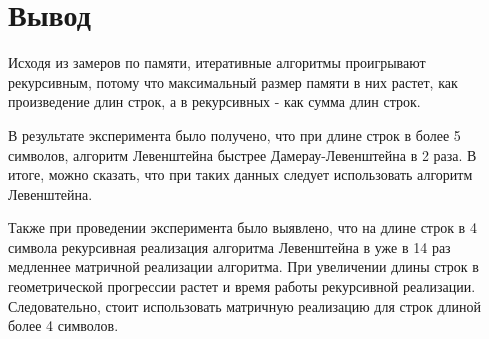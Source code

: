 \section{Вывод}

Исходя из замеров по памяти, итеративные алгоритмы проигрывают рекурсивным, потому что максимальный размер памяти в них растет, как произведение длин строк, а в рекурсивных - как сумма длин строк.

В результате эксперимента было получено, что при длине строк в более 5 символов, алгоритм Левенштейна быстрее Дамерау-Левенштейна в 2 раза. В итоге, можно сказать, что при таких данных следует использовать алгоритм Левенштейна.

Также при проведении эксперимента было выявлено, что на длине строк в 4 символа рекурсивная реализация алгоритма Левенштейна в уже в 14 раз медленнее матричной реализации алгоритма. При увеличении длины строк в геометрической прогрессии растет и время работы рекурсивной реализации. Следовательно, стоит использовать матричную реализацию для строк длиной более 4 символов.
